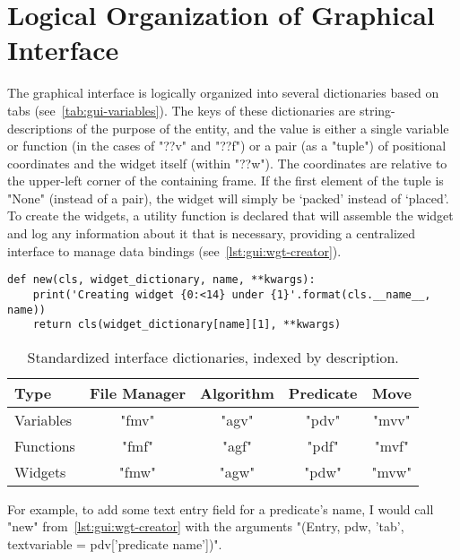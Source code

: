 \section{Logical Organization of Graphical Interface}
\label{sec:gui-org}

The graphical interface is logically organized into several dictionaries based on tabs
  (see~\autoref{tab:gui-variables}).
The keys of these dictionaries are string-descriptions of the purpose of the entity,
  and the value is either a single variable or function (in the cases of "??v" and "??f")
  or a pair (as a "tuple") of positional coordinates and the widget itself (within "??w").
The coordinates are relative to the upper-left corner of the containing frame.
If the first element of the tuple is "None" (instead of a pair),
  the widget will simply be \enquote*{packed} instead of \enquote*{placed}.
To create the widgets, a utility function is declared that will assemble the widget
  and log any information about it that is necessary,
  providing a centralized interface to manage data bindings (see~\autoref{lst:gui:wgt-creator}).

\begin{lstlisting}[float,caption={A standardized widget creator},label={lst:gui:wgt-creator}]
def new(cls, widget_dictionary, name, **kwargs):
    print('Creating widget {0:<14} under {1}'.format(cls.__name__, name))
    return cls(widget_dictionary[name][1], **kwargs)
\end{lstlisting}
\begin{table}
  \centering
  \begin{tabular}{lcccc}
    \toprule
    Type      & File Manager & Algorithm & Predicate & Move  \\ \midrule
    Variables & "fmv"        & "agv"     & "pdv"     & "mvv" \\
    Functions & "fmf"        & "agf"     & "pdf"     & "mvf" \\
    Widgets   & "fmw"        & "agw"     & "pdw"     & "mvw" \\
    \bottomrule
  \end{tabular}
  \caption{Standardized interface dictionaries, indexed by description.}
  \label{tab:gui-variables}
\end{table}

For example, to add some text entry field for a predicate's name,
  I would call "new" from~\autoref{lst:gui:wgt-creator} with the arguments
  "(Entry, pdw, 'tab', textvariable = pdv['predicate name'])".

